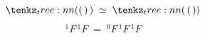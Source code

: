 \documentclass[varwidth=19cm, border=6pt]{standalone}
\begin{document}
\[
  \tntree{(({}\,{})\,{})} \;\simeq\; \tntree{({}\,({}\,{}))}
\]
\[
  {}^{1}F\,{}^{1}F \;=\; {}^{0}F\,{}^{1}F\,{}^{1}F
\]
\end{document}
